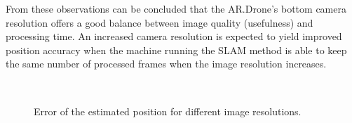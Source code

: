 From these observations can be concluded that the AR.Drone's bottom camera resolution offers a good balance between image quality (usefulness) and processing time.
An increased camera resolution is expected to yield improved position accuracy when the machine running the SLAM method is able to keep the same number of processed frames when the image resolution increases.




\begin{figure}[htb!]
  \begin{center}
\\

 \end{center}
  \caption{Error of the estimated position for different image resolutions.}
  \label{fig:exp3-error}
\end{figure}



